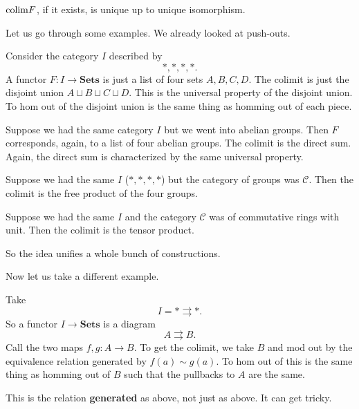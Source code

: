 \begin{proposition} 
$\mathrm{colim} F$, if it exists, is unique up to unique isomorphism. 
\end{proposition} 

Let us go through some examples. We already looked at push-outs. 

\begin{example} 
Consider the category $I$ described by
\[ \ast, \ast, \ast, \ast.  \]
A functor $F: I \to \mathbf{Sets}$ is just a list of four sets $A, B, C, D$. 
The colimit is just the disjoint union $A \sqcup B \sqcup C \sqcup D$. This is
the universal property of the disjoint union. To hom out of the disjoint union
is the same thing as homming out of each piece.
\end{example} 


\begin{example} 
Suppose we had the same category $I$ but we went into abelian groups. Then $F$
corresponds, again, to a list of four abelian groups. The colimit is the direct
sum. Again, the direct sum is characterized by the same universal property. 
\end{example} 

\begin{example} 
Suppose we had the same $I$ ($\ast, \ast, \ast, \ast$) but the category of
groups was $\mathcal{C}$. Then the colimit is the
free product of the four groups. 
\end{example} 

\begin{example} 
Suppose we had the same $I$ and the category $\mathcal{C}$ was of commutative
rings with unit. Then the colimit is the tensor product. 
\end{example} 

So the idea unifies a whole bunch of constructions. 

Now let us take a different example.

\begin{example} 
Take 
\[ I = \ast \rightrightarrows \ast.  \]
So a functor $I \to \mathbf{Sets}$ is a diagram
\[ A \rightrightarrows B.  \]
Call the two maps $f,g: A \to B$. To get the colimit, we take $B$ and mod out
by the equivalence relation generated by $f(a) \sim g(a)$. 
To hom out of this is the same thing as homming  out of $B$ such that the
pullbacks to $A$ are the same. 

This is the relation \textbf{generated} as above, not just as above. It can get
tricky.
\end{example} 

